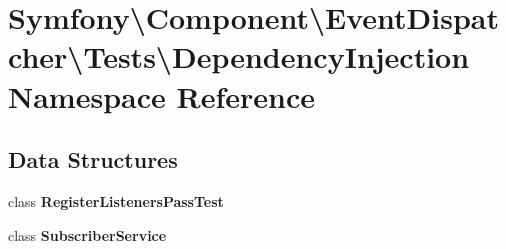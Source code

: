 \section{Symfony\textbackslash{}Component\textbackslash{}Event\+Dispatcher\textbackslash{}Tests\textbackslash{}Dependency\+Injection Namespace Reference}
\label{namespace_symfony_1_1_component_1_1_event_dispatcher_1_1_tests_1_1_dependency_injection}
\subsection*{Data Structures}
\begin{DoxyCompactItemize}
\item 
class {\bf Register\+Listeners\+Pass\+Test}
\item 
class {\bf Subscriber\+Service}
\end{DoxyCompactItemize}
